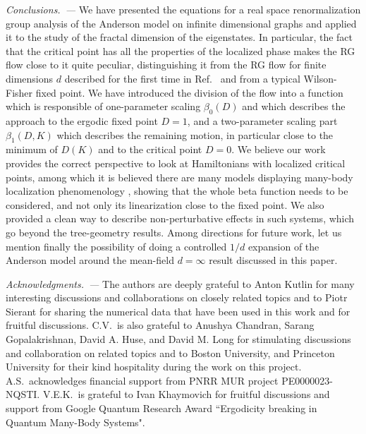 \documentclass[reprint,aps,prl,superscriptaddress,english,nolongbibliography]{revtex4-2}
\begin{document}
{\emph{Conclusions.~---} We have presented the equations for a real space renormalization group analysis of the Anderson model on infinite dimensional graphs and applied it to the study of the fractal dimension of the eigenstates. In particular, the fact that the critical point has all the properties of the localized phase makes the RG flow close to it quite peculiar, distinguishing it from the RG flow for finite dimensions $d$ described for the first time in Ref.~\cite{abrahams1979scaling} and from a typical Wilson-Fisher fixed point. We have introduced the division of the flow into a function which is responsible of one-parameter scaling $\beta_0(D)$ and which describes the approach to the ergodic fixed point $D=1$, and a two-parameter scaling part $\beta_1(D,K)$ which describes the remaining motion, in particular close to the minimum of $D(K)$ and to the critical point $D=0$. We believe our work provides the correct perspective to look at Hamiltonians with localized critical points, among which it is believed there are many models displaying many-body localization phenomenology \cite{Deluca13}, showing that the whole beta function needs to be considered, and not only its linearization close to the fixed point. We also provided a clean way to describe non-perturbative effects in such systems, which go beyond the tree-geometry results. Among directions for future work, let us mention finally the possibility of doing a controlled $1/d$ expansion of the Anderson model around the mean-field $d=\infty$ result discussed in this paper.

\begin{acknowledgments}

\emph{Acknowledgments.~---}
The authors are deeply grateful to Anton Kutlin for many interesting discussions and collaborations on closely related topics and to Piotr Sierant for sharing the numerical data that have been used in this work and for fruitful discussions.
C.V.\ is also grateful to Anushya Chandran, Sarang Gopalakrishnan, David A. Huse, and David M. Long for stimulating discussions and collaboration on related topics and to Boston University, and Princeton University for their kind hospitality during the work on this project. A.S.\ acknowledges financial support from PNRR MUR project PE0000023-NQSTI. V.E.K.\ is grateful to Ivan Khaymovich for fruitful
discussions and support from Google Quantum Research Award ``Ergodicity breaking in Quantum Many-Body Systems".
 
\end{acknowledgments}

}
\end{document}
